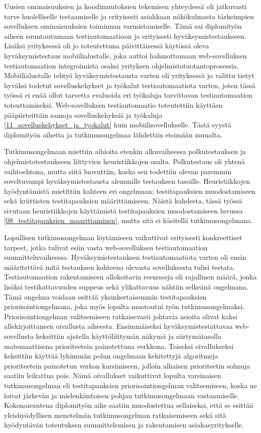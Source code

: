 Uusien ominaisuuksien ja koodimuutoksien tekemisen yhteydessä oli jatkuvasti tarve huolelliselle testaamiselle ja erityisesti asiakkaan näkökulmasta tärkeimpien sovelluksen ominaisuuksien toiminnan varmistamiselle.
Tämä sai diplomityön aiheen suuntautumaan testiautomaatioon ja erityisesti hyväksymistestaukseen.
Lisäksi yrityksessä oli jo toteutettuna päivittäisessä käytössä oleva hyväksymistestaus mobiilialustalle, joka auttoi hahmottamaan web-sovelluksen testiautomaation integroimista osaksi yrityksen ohjelmistotuotantoprosessia.
Mobiilialustalle tehtyä hyväksymistestausta varten oli yrityksessä jo valittu tietyt hyväksi todetut sovelluskehykset ja työkalut testiautomaatiota varten, joten tässä työssä ei enää ollut tarvetta evaluoida eri työkaluja tarvittavan testiautomaation toteuttamiseksi.
Web-sovelluksen testiautomaatio toteutettiin käyttäen pääpiirteittäin samoja sovelluskehyksiä ja työkaluja \ref{11_sovelluskehykset_ja_tyokalut} kuin mobiilisovellukselle.
Tästä syystä diplomityön aihetta ja tutkimusongelmaa lähdettiin etsimään muualta.

Tutkimusongelmaan miettiin aihioita etenkin alkuvaiheessa polkutestauksen ja ohjelmistotestaukseen liittyvien heuristiikkojen osalta.
Polkutestaus oli yhtenä vaihtoehtona, mutta siitä luovuttiin, koska sen todettiin olevan paremmin soveltuvampi hyväksymistestausta alemmille testauksen tasoille.
Heuristiikkojen hyödyntämistä mietittiin kahteen eri ongelmaan; testitapauksien muodostamiseen sekä kriittisten testitapauksien määrittämiseen.
Näistä kahdesta, tässä työssä sivutaan heuristiikkojen käyttämistä testitapauksien muodostamiseen luvussa \ref{08_testitapauksien_maarittaminen}, mutta sitä ei käsitellä tutkimusongelmana.

Lopullisen tutkimusongelman löytämiseen vaikuttivat erityisesti konkreettiset tarpeet, jotka tulivat esiin vasta web-sovelluksen testiautomaation suunnitteluvaiheessa.
Hyväksymistestauksen testiautomaatiota varten oli ensin määritettävä mitä testauksen kohteena olevasta sovelluksesta tulisi testata.
Testiautomaation rakentamiseen allokoitavia resursseja oli rajallinen määrä, jonka lisäksi testikattavuuden suppeus sekä ylikattavuus nähtiin selkeänä ongelmana.
Tämä ongelma voidaan esittää yksinkertaisemmin testitapauksien priorisointiongelmana, joka myös lopulta muotoutui työn tutkimusongelmaksi.
Priorisointiongelman valitsemiseen ratkaisevasti johtavia asioita olivat kaksi allekirjoittaneen oivallusta aiheesta.
Ensimmäiseksi hyväksymistestattavaa web-sovellusta keksittiin ajatella käyttöliittymän näkymä ja siirtymätasolla matemaattisena prioriteetein painotettuna verkkona.
Toiseksi oivallukseksi keksittiin käyttää lyhimmän polun ongelmaan kehitettyjä algoritmeja prioriteetein painotetun verkon karsimiseen, jolloin alhaisen prioriteetin solmuja saatiin leikattua pois.
Nämä oivallukset vaikuttivat lopulta varsinaisen tutkimusongelman eli testitapauksien priorisointiongelman valitsemiseen, koska ne loivat järkevän ja mielenkiintoisen pohjan tutkimusongelmaan vastaamiselle.
Kokonaisuutena diplomityön aihe saatiin muodostettua sellaiseksi, että se esittää yleishyödyllisen menetelmän tutkimusongelman ratkaisemiseen sekä sitä hyödyntävän toteutuksen suunnittelemisen ja rakentamisen asiakasyritykselle.

